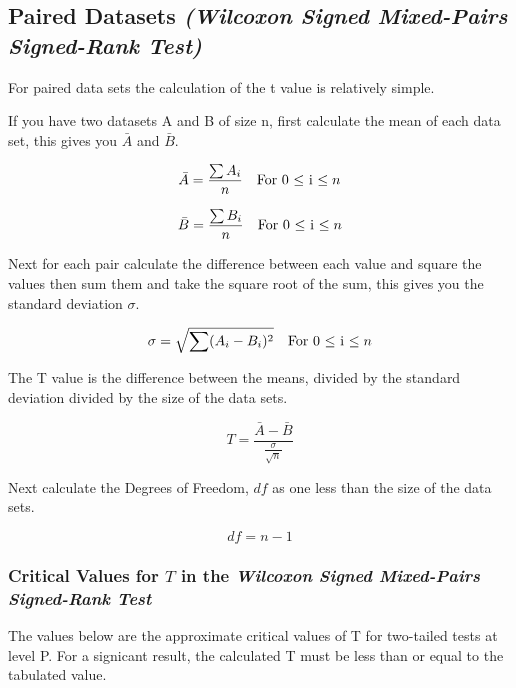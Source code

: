 \subsection{Paired Datasets \emph{(Wilcoxon Signed Mixed-Pairs Signed-Rank Test)}}
For paired data sets the calculation of the t value is relatively simple.

If you have two datasets A and B of size n, first calculate the mean of each data set, this gives you $\bar A$ and $\bar B$.  

\begin{equation}
    \bar A = \frac{\sum A_i}{n} \text{\quad For 0 $\leq$ i $\leq n$}
\end{equation}

\begin{equation}
\bar B = \frac{\sum B_i}{n} \text{\quad For 0 $\leq$ i $\leq n$}
\end{equation}

Next for each pair calculate the difference between each value and square the values then sum them and take the square root of the sum, this gives you the standard deviation $\sigma$.

\begin{equation}
    \sigma = \sqrt{\sum (A_i - B_i)^2} \text{\quad For 0 $\leq$ i $\leq n$}
\end{equation}

The T value is the difference between the means, divided by the standard deviation divided by the size of the data sets.

\begin{equation}
    T = \frac{\bar A - \bar B}{\frac{\sigma}{\sqrt n}}
\end{equation}

Next calculate the Degrees of Freedom, $df$ as one less than the size of the data sets.

\begin{equation}
    df = n - 1
\end{equation}



\subsubsection{Critical Values for $T$ in the \emph{Wilcoxon Signed Mixed-Pairs Signed-Rank Test}}


The values below are the approximate critical values of T for two-tailed tests at level P. For a signicant result, the calculated T must be less  than or equal to the tabulated value.

